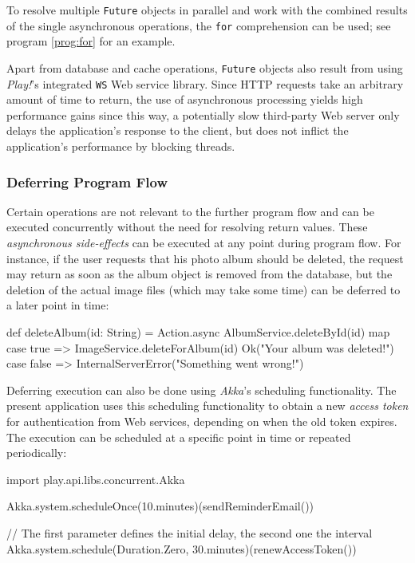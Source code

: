 To resolve multiple \texttt{Future} objects in parallel and work with the combined results of the single asynchronous operations, the \texttt{for} comprehension can be used; see program \ref{prog:for} for an example.

Apart from database and cache operations, \texttt{Future} objects also result from using \textit{Play!}'s integrated \texttt{WS} Web service library. Since HTTP requests take an arbitrary amount of time to return, the use of asynchronous processing yields high performance gains since this way, a potentially slow third-party Web server only delays the application's response to the client, but does not inflict the application's performance by blocking threads. 

\subsubsection*{Deferring Program Flow}
Certain operations are not relevant to the further program flow and can be executed concurrently without the need for resolving return values. These \textit{asynchronous side-effects} can be executed at any point during program flow. For instance, if the user requests that his photo album should be deleted, the request may return as soon as the album object is removed from the database, but the deletion of the actual image files (which may take some time) can be deferred to a later point in time:

\begin{JavaCode}
def deleteAlbum(id: String) = Action.async {
    AlbumService.deleteById(id) map {
        case true =>
            ImageService.deleteForAlbum(id)
            Ok("Your album was deleted!")
        case false =>
            InternalServerError("Something went wrong!")
    }
}
 
\end{JavaCode}

Deferring execution can also be done using \textit{Akka}'s scheduling functionality. The present application uses this scheduling functionality to obtain a new \textit{access token} for authentication from Web services, depending on when the old token expires. The execution can be scheduled at a specific point in time or repeated periodically:
\begin{JavaCode}
import play.api.libs.concurrent.Akka

Akka.system.scheduleOnce(10.minutes)(sendReminderEmail())

// The first parameter defines the initial delay, the second one the interval
Akka.system.schedule(Duration.Zero, 30.minutes)(renewAccessToken())

\end{JavaCode}

